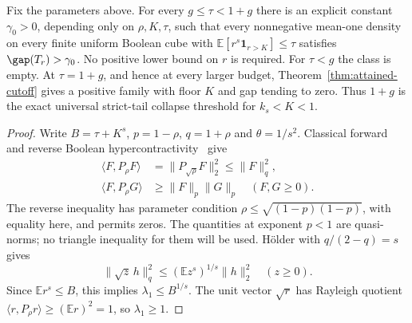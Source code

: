 \begin{theorem}\label{thm:universal-tail}
Fix the parameters above. For every $g\le\tau<1+g$ there is an explicit
constant $\gamma_0>0$, depending only on $\rho,K,\tau$, such that every
nonnegative mean-one density on every finite uniform Boolean cube with
$\mathbb E[r^s\mathbf1_{r>K}]\le\tau$ satisfies
$\gap(T_r)>\gamma_0$. No positive lower bound on $r$ is required.
For $\tau<g$ the class is empty. At $\tau=1+g$, and hence at every larger
budget, Theorem~\ref{thm:attained-cutoff} gives a positive family with
floor $K$ and gap tending to zero. Thus $1+g$ is the exact universal
strict-tail collapse threshold for $k_s<K<1$.
\end{theorem}
\begin{proof}
Write $B=\tau+K^s$, $p=1-\rho$, $q=1+\rho$ and
$\theta=1/s^2$. Classical forward and reverse Boolean
hypercontractivity~\cite[Theorem~3.1 and Corollary~3.3]{MORSS} give
\begin{align}
 \langle F,P_\rho F\rangle
   &=\|P_{\sqrt\rho}F\|_2^2\le\|F\|_q^2,\label{eq:317-forward}\\
 \langle F,P_\rho G\rangle&\ge\|F\|_p\|G\|_p
                 \quad(F,G\ge0).\label{eq:317-reverse}
\end{align}
The reverse inequality has parameter condition
$\rho\le\sqrt{(1-p)(1-p)}$, with equality here, and permits zeros.
The quantities at exponent $p<1$ are quasi-norms; no triangle inequality
for them will be used. H\"older with $q/(2-q)=s$ gives
\[
 \|\sqrt z\,h\|_q^2\le(\mathbb Ez^s)^{1/s}\|h\|_2^2
 \quad(z\ge0).
\]
Since $\mathbb Er^s\le B$, this implies $\lambda_1\le B^{1/s}$.
The unit vector $\sqrt r$ has Rayleigh quotient
$\langle r,P_\rho r\rangle\ge(\mathbb Er)^2=1$, so
$\lambda_1\ge1$.


\end{proof}
